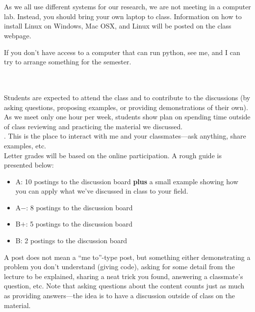 \documentclass[11pt]{article}
\begin{document}
\ \\[-2mm]
 \\
%
As we all use different systems for our research, we are not meeting
in a computer lab.  Instead, you should bring your own laptop to
class.  Information on how to install Linux on Windows, Mac OSX, and
Linux will be posted on the class webpage. 

\noindent
If you don't have access to a computer that can run python, see me,
and I can try to arrange something for the semester.

\ \\[-2mm]
 \\
%
Students are expected to attend the class and to contribute
to the discussions (by asking questions, proposing examples, or
providing demonstrations of their own).  As we meet only one hour per
week, students show plan on spending time outside of class reviewing
and practicing the material we discussed. \\

.  This is the place to interact with
me and your classmates---ask anything, share examples, etc. \\

\noindent Letter grades will be based on the online participation.  A
rough guide is presented below:
\begin{itemize}
\item {\sf A\phantom{+}}: 10 postings to the discussion board
  {\bf plus} a small example showing how you can apply what
  we've discussed in class to your field.

\item {\sf A$-$}: 8 postings to the discussion board

\item {\sf B$+$}: 5 postings to the discussion board

\item {\sf B\phantom{+}}:  2 postings to the discussion board
\end{itemize}
A post does not mean a ``me to''-type post, but something either
demonstrating a problem you don't understand (giving code), asking for
some detail from the lecture to be explained, sharing a neat trick you
found, answering a classmate's question, etc.  Note that asking
questions about the content counts just as much as providing
answers---the idea is to have a discussion outside of class on the
material.
\end{document}
